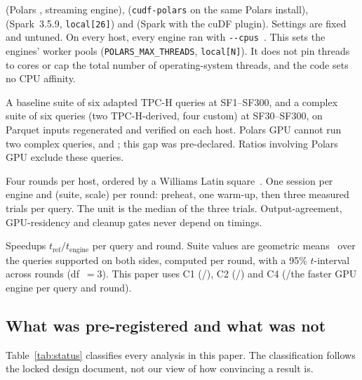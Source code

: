 \documentclass[11pt]{article}
\begin{document}
\begin{description}[leftmargin=*,itemsep=2pt]
  \item[Arms.] \polarscpu{} (Polars \polarsold, streaming engine),
    \polarsgpu{} (\texttt{cudf-polars}  on
    the same Polars install), \sparkcpu{} (Spark~3.5.9, \texttt{local[26]}) and
    \sparkgpu{} (Spark with the cuDF plugin). Settings are fixed and untuned.
    On every host, every engine ran with \texttt{-{}-cpus}~.
    This sets the engines' worker pools (\texttt{POLARS\_MAX\_THREADS},
    \texttt{local[N]}). It does not pin threads to cores or cap the total number
    of operating-system threads, and the code sets no CPU affinity.
  \item[Workload.] A baseline suite of six adapted TPC-H queries at SF1--SF300,
    and a complex suite of six queries (two TPC-H-derived, four custom) at
    SF30--SF300, on Parquet inputs regenerated and verified on each host.
    Polars GPU cannot run two complex queries,  and
    ; this gap was pre-declared. Ratios involving Polars GPU
    exclude these queries.
  \item[Protocol.] Four rounds per host, ordered by a Williams Latin
    square~\citep{williams1949latin}. One session per engine and (suite, scale)
    per round: preheat, one warm-up, then three measured trials per query. The
    unit is the median of the three trials. Output-agreement, GPU-residency and
    cleanup gates never depend on timings.
  \item[Contrasts.] Speedups $t_{\mathrm{ref}}/t_{\mathrm{engine}}$ per query
    and round. Suite values are geometric means~\citep{fleming1986geomean} over
    the queries supported on both sides, computed per round, with a 95\%
    $t$-interval across rounds (df~$=3$). This paper uses C1
    (\polarscpu{}/\polarsgpu{}), C2 (\sparkcpu{}/\sparkgpu{}) and C4
    (\polarscpu{}/the faster GPU engine per query and round).
\end{description}

\subsection{What was pre-registered and what was not}
\label{sec:status}

Table~\ref{tab:status} classifies every analysis in this paper. The
classification follows the locked design document, not our view of how
convincing a result is.
\end{document}
